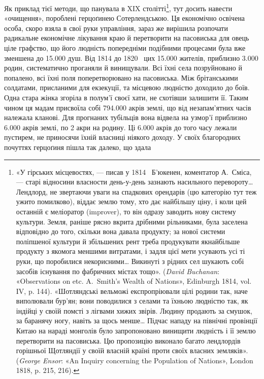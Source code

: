 Як приклад тієї методи, що панувала в XIX столітті\footnote{
«У гірських місцевостях, — писав у 1814~ Б’юкенен, коментатор
А.~Сміса, — старі відносини власности день-у-день зазнають насильного
перевороту\dots{} Лендлорд, не звертаючи уваги на спадкових орендарів
(цю категорію тут теж ужито помилково), віддає землю тому, хто дає найбільшу
ціну, і коли цей останній є меліоратор (improver), то він одразу заводить
нову систему культури. Земля, раніше рясно вкрита дрібними рільниками,
була заселена відповідно до того, скільки вона давала продукту;
за нової системи поліпшеної культури й збільшених рент треба продукувати
якнайбільше продукту з якомога меншими витратами, і задля цієї
мети усувають усі ті руки, що поробилися некорисними\dots{} Викинуті з
рідних сел шукають собі засобів існування по фабричних містах тощо».
(\emph{David Buchanan}: «Observations on etc. A.~Smith’s Wealth of Nations»,
Edinburgh 1814, vol. IV, p. 144). «Шотляндські вельможі експропріювали
цілі родини так, наче виполювали бур’ян; вони поводилися з селами
та їхньою людністю так, як індійці у своїй помсті з лігвами хижих звірів.
Людину продають за смушок, за баранячу ногу, навіть за щось
менше\dots{} Підчас нападу на північні провінції Китаю на нараді монголів
було запропоновано винищити людність і її землю перетворити на пасовиська.
Цю пропозицію виконало багато лендлордів горішньої Щотляндії
у своїй власній країні проти своїх власних земляків». (\emph{George
Ensor}: «An Inquiry concerning the Population of Nations», London 1818,
p. 215, 216).
}, тут досить
навести «очищення», пороблені герцоґинею Сотерлендською.
Ця економічно освічена особа, скоро взяла в свої руки управління,
зараз же вирішила розпочати радикальне економічне лікування
краю й перетворити на пасовиська для овець ціле графство,
що його людність попередніми подібними процесами була
вже зменшена до \num{15.000} душ. Від 1814 до 1820~ цих \num{15.000} жителів,
приблизно \num{3.000} родин, систематично проганяли й винищували.
Всі їхні села позруйновано й попалено, всі їхні поля
поперетворювано на пасовиська. Між брітанськими солдатами,
присланими для екзекуції, та місцевою людністю доходило до
боїв. Одна стара жінка згоріла в полум’ї своєї хати, не схотівши
залишити її. Таким чином ця мадам присвоїла собі \num{794.000} акрів
землі, що від незапам’ятних часів належала кланові. Для прогнаних
тубільців вона відвела на узмор’ї приблизно \num{6.000} акрів
землі, по 2 акри на родину. Ці \num{6.000} акрів до того часу лежали
пустирем, не приносячи їхній власниці ніякого доходу. У своїх
благородних почуттях герцоґиня пішла так далеко, що здала

